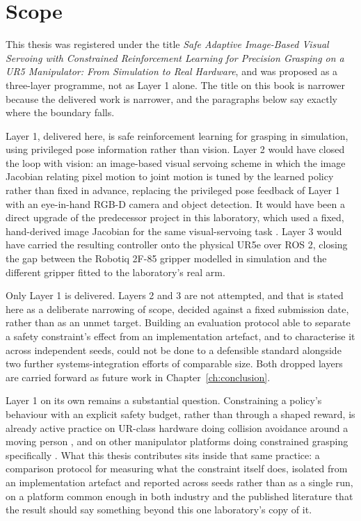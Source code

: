 \section{Scope}\label{sec:i-scope}

This thesis was registered under the title \textit{Safe Adaptive Image-Based Visual Servoing with
Constrained Reinforcement Learning for Precision Grasping on a UR5 Manipulator: From Simulation to
Real Hardware}, and was proposed as a three-layer programme, not as Layer 1 alone. The title on
this book is narrower because the delivered work is narrower, and the paragraphs below say exactly
where the boundary falls.

Layer 1, delivered here, is safe reinforcement learning for grasping in simulation, using
privileged pose information rather than vision. Layer 2 would have closed the loop with vision: an
image-based visual servoing scheme in which the image Jacobian relating pixel motion to joint
motion is tuned by the learned policy rather than fixed in advance, replacing the privileged pose
feedback of Layer 1 with an eye-in-hand RGB-D camera and object detection. It would have been a
direct upgrade of the predecessor project in this laboratory, which used a fixed, hand-derived
image Jacobian for the same visual-servoing task \cite{khan2025csrt_ibvs}. Layer 3 would have
carried the resulting controller onto the physical UR5e over ROS 2, closing the gap between the
Robotiq 2F-85 gripper modelled in simulation and the different gripper fitted to the laboratory's
real arm.

Only Layer 1 is delivered. Layers 2 and 3 are not attempted, and that is stated here as a
deliberate narrowing of scope, decided against a fixed submission date, rather than as an unmet
target. Building an evaluation protocol able to separate a safety constraint's effect from an
implementation artefact, and to characterise it across independent seeds, could not be done to a
defensible standard alongside two further systems-integration efforts of comparable size. Both
dropped layers are carried forward as future work in Chapter~\ref{ch:conclusion}.

Layer 1 on its own remains a substantial question. Constraining a policy's behaviour with an explicit
safety budget, rather than through a shaped reward, is already active practice on UR-class
hardware doing collision avoidance around a moving person \cite{xia2024proactive}, and on other
manipulator platforms doing constrained grasping specifically \cite{khan2026rl_precision_grasping}.
What this thesis contributes sits inside that same practice: a comparison protocol for measuring
what the constraint itself does, isolated from an implementation artefact and reported across
seeds rather than as a single run, on a platform common enough in both industry and the published
literature that the result should say something beyond this one laboratory's copy of it.

